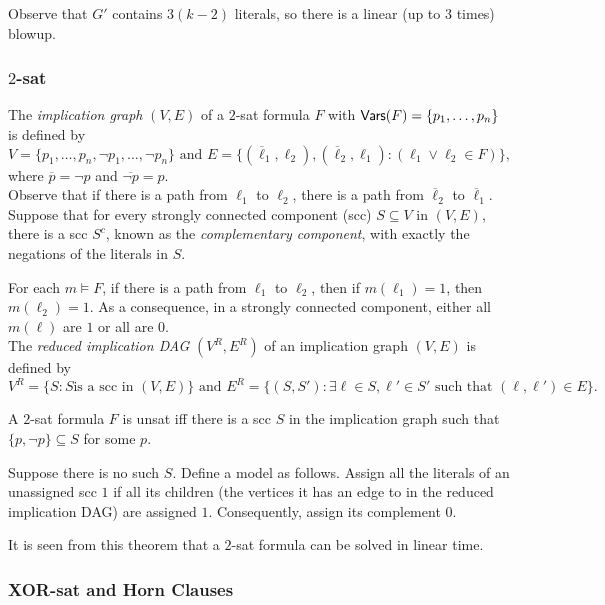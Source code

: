 Observe that $G'$ contains $3(k-2)$ literals, so there is a linear (up to $3$ times) blowup.

\subsubsection{\texorpdfstring{$2$}{2}-sat}

The \textit{implication graph} $(V,E)$ of a $2$-sat formula $F$ with $\mathsf{Vars}(F)=\{p_1,\ldots,p_n\}$ is defined by
\[ V = \{p_1,\ldots,p_n,\neg p_1,\ldots,\neg p_n\}\text{ and }E=\{(\overline{\ell}_1,\ell_2),(\overline{\ell}_2,\ell_1) : (\ell_1\lor\ell_2\in F)\}, \]
where $\overline{p} = \neg p$ and $\overline{\neg p} = p$.\\

Observe that if there is a path from $\ell_1$ to $\ell_2$, there is a path from $\overline{\ell}_2$ to $\overline{\ell}_1$.\\
Suppose that for every strongly connected component (scc) $S\subseteq V$ in $(V,E)$, there is a scc $S^c$, known as the \textit{complementary component}, with exactly the negations of the literals in $S$.

For each $m\vDash F$, if there is a path from $\ell_1$ to $\ell_2$, then if $m(\ell_1)=1$, then $m(\ell_2)=1$. As a consequence, in a strongly connected component, either all $m(\ell)$ are $1$ or all are $0$.\\

The \textit{reduced implication DAG} $(V^R,E^R)$ of an implication graph $(V,E)$ is defined by
\[ V^R = \{S : S\text{is a scc in }(V,E)\}\text{ and }E^R = \{(S,S') : \exists \ell\in S,\ell'\in S' \text{ such that }(\ell,\ell')\in E \}. \]

\begin{theorem}
	A $2$-sat formula $F$ is unsat iff there is a scc $S$ in the implication graph such that $\{p,\neg p\}\subseteq S$ for some $p$.
\end{theorem}

	Suppose there is no such $S$. Define a model as follows. Assign all the literals of an unassigned scc $1$ if all its children (the vertices it has an edge to in the reduced implication DAG) are assigned $1$. Consequently, assign its complement $0$.

It is seen from this theorem that a $2$-sat formula can be solved in linear time.

\subsubsection{XOR-sat and Horn Clauses}

